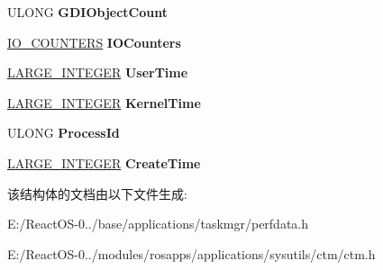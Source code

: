 \begin{DoxyCompactItemize}
U\+L\+O\+NG {\bfseries G\+D\+I\+Object\+Count}
\item 
\mbox{\label{struct___p_e_r_f_d_a_t_a_a1b086a60a5b32874ef9e34d491c963f4}} 
\hyperlink{struct___i_o___c_o_u_n_t_e_r_s}{I\+O\+\_\+\+C\+O\+U\+N\+T\+E\+RS} {\bfseries I\+O\+Counters}
\item 
\mbox{\label{struct___p_e_r_f_d_a_t_a_a3974fb98b337033da16557327085cff6}} 
\hyperlink{union___l_a_r_g_e___i_n_t_e_g_e_r}{L\+A\+R\+G\+E\+\_\+\+I\+N\+T\+E\+G\+ER} {\bfseries User\+Time}
\item 
\mbox{\label{struct___p_e_r_f_d_a_t_a_a669ced24e8a0462ae7d6737ce59a4a95}} 
\hyperlink{union___l_a_r_g_e___i_n_t_e_g_e_r}{L\+A\+R\+G\+E\+\_\+\+I\+N\+T\+E\+G\+ER} {\bfseries Kernel\+Time}
\item 
\mbox{\label{struct___p_e_r_f_d_a_t_a_a2fa6868bbfeca2f543d44bc2856d03b2}} 
U\+L\+O\+NG {\bfseries Process\+Id}
\item 
\mbox{\label{struct___p_e_r_f_d_a_t_a_a85ee726db17cf67408a4cdc38c1bf88b}} 
\hyperlink{union___l_a_r_g_e___i_n_t_e_g_e_r}{L\+A\+R\+G\+E\+\_\+\+I\+N\+T\+E\+G\+ER} {\bfseries Create\+Time}
\end{DoxyCompactItemize}


该结构体的文档由以下文件生成\+:\begin{DoxyCompactItemize}
\item 
E\+:/\+React\+O\+S-\/0../base/applications/taskmgr/perfdata.\+h\item 
E\+:/\+React\+O\+S-\/0../modules/rosapps/applications/sysutils/ctm/ctm.\+h\end{DoxyCompactItemize}
